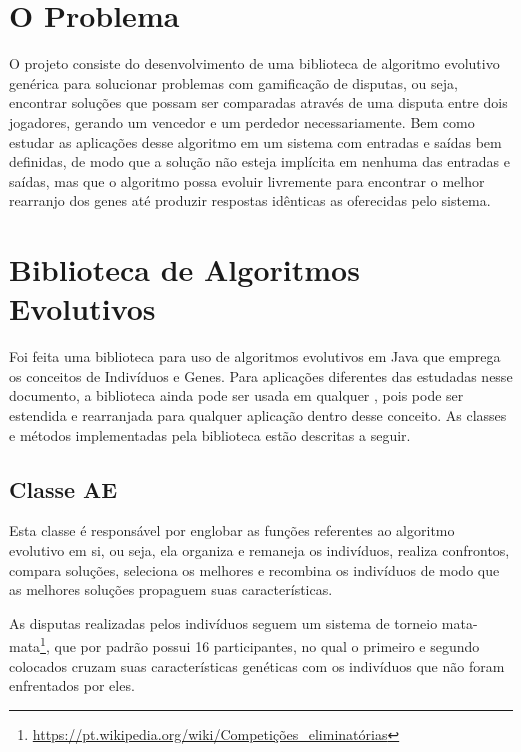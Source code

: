\section{O Problema}

O projeto consiste do desenvolvimento de uma biblioteca de algoritmo evolutivo genérica para solucionar problemas com gamificação de disputas, ou seja, encontrar soluções que possam ser comparadas através de uma disputa entre dois jogadores, gerando um vencedor e um perdedor necessariamente. Bem como estudar as aplicações desse algoritmo em um sistema com entradas e saídas bem definidas, de modo que a solução não esteja implícita em nenhuma das entradas e saídas, mas que o algoritmo possa evoluir livremente para encontrar o melhor rearranjo dos genes até produzir respostas idênticas as oferecidas pelo sistema.

\section{Biblioteca de Algoritmos Evolutivos}

Foi feita uma biblioteca para uso de algoritmos evolutivos em Java que emprega os conceitos de Indivíduos e Genes. Para aplicações diferentes das estudadas nesse documento, a biblioteca ainda pode ser usada em qualquer \SE, pois pode ser estendida e rearranjada para qualquer aplicação dentro desse conceito. As classes e métodos implementadas pela biblioteca estão descritas a seguir.

\subsection{Classe AE}

Esta classe é responsável por englobar as funções referentes ao algoritmo evolutivo em si, ou seja, ela organiza e remaneja os indivíduos, realiza confrontos, compara soluções, seleciona os melhores e recombina os indivíduos de modo que as melhores soluções propaguem suas características.

As disputas realizadas pelos indivíduos seguem um sistema de torneio mata-mata\footnote{\url{https://pt.wikipedia.org/wiki/Competições_eliminatórias}}, que por padrão possui 16 participantes, no qual o primeiro e segundo colocados cruzam suas características genéticas com os indivíduos que não foram enfrentados por eles.

